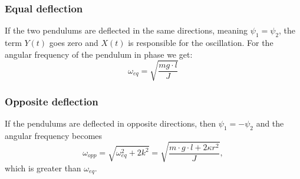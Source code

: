 \documentclass{article}
\begin{document}
\subsubsection{Equal deflection}
If the two pendulums are deflected in the same directions, meaning $\psi_1 = \psi_2$, the term $Y(t)$ goes zero and $X(t)$ is responsible for the oscillation. For the angular frequency of the pendulum in phase we get:
\begin{equation}
\omega_{eq} = \sqrt{\frac{mg \cdot l}{J}}
\end{equation}
\subsubsection{Opposite deflection}
If the pendulums are deflected in opposite directions, then $\psi_1 = - \psi_2$ and the angular frequency becomes
\begin{equation}
\omega_{opp} = \sqrt{\omega_{eq}^2 + 2k^2} = \sqrt{\frac{m \cdot g \cdot l + 2 \kappa r^2}{J}},
\end{equation}
which is greater than $\omega_{eq}$.
\end{document}
